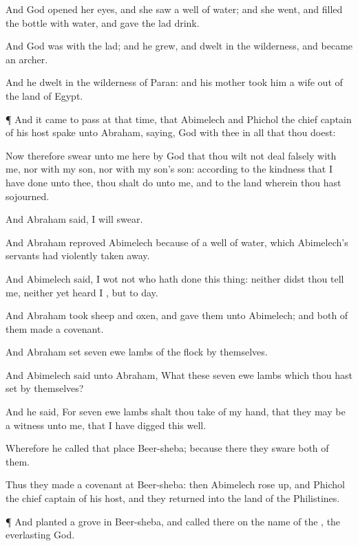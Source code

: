 {And
God
opened her
eyes, and she
saw a
well of
water; and she
went, and
filled the
bottle with
water, and
gave the
lad
drink.

And
God was with the
lad; and he
grew, and
dwelt in the
wilderness, and became an
archer.

And he
dwelt in the
wilderness of
Paran: and his
mother
took him a
wife out of the
land of
Egypt.


\par }{\PP {}¶ And it came to pass at that
time, that
Abimelech and
Phichol the chief
captain of his
host
spake unto
Abraham,
saying,
God
{} with thee in all that thou
doest:

Now therefore
swear unto me
here by
God that thou wilt not deal
falsely with me, nor with my
son, nor with my
son’s son:
{} according to the
kindness that I have
done unto thee, thou shalt
do unto me, and to the
land wherein thou hast
sojourned.

And
Abraham
said, I will
swear.

And
Abraham
reproved
Abimelech
because of a
well of
water, which
Abimelech’s
servants had violently taken
away.

And
Abimelech
said, I
wot not who hath
done this
thing:
neither didst thou
tell me,
neither yet
heard I
{},
but to
day.

And
Abraham
took
sheep and
oxen, and
gave them unto
Abimelech; and both of
them
made a
covenant.

And
Abraham
set
seven ewe
lambs of the
flock by themselves.

And
Abimelech
said unto
Abraham,
What
{} these
seven ewe
lambs which thou hast
set by themselves?

And he
said, For
{}
seven ewe
lambs shalt thou
take of my
hand,
that they may be a
witness unto me, that I have
digged this
well.

Wherefore he
called that
place
Beer-sheba; because there they
sware both of
them.

Thus they
made a
covenant at
Beer-sheba: then
Abimelech rose
up, and
Phichol the chief
captain of his
host, and they
returned into the
land of the
Philistines.


\par }{\PP {}¶ And
{}
planted a
grove in
Beer-sheba, and
called there on the
name of the
{}, the
everlasting
God.

}
